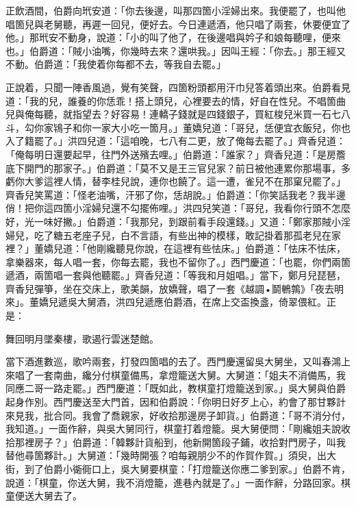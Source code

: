 正飲酒間，伯爵向玳安道：「你去後邊，叫那四箇小淫婦出來。我便罷了，也叫他唱箇兒與老舅聽，再遲一回兒，便好去。今日連遞酒，他只唱了兩套，休要便宜了他。」那玳安不動身，說道：「小的叫了他了，在後邊唱與妗子和娘每聽哩，便來也。」伯爵道：「賊小油嘴，你幾時去來？還哄我。」因叫王經：「你去。」那王經又不動。伯爵道：「我使着你每都不去，等我自去罷。」

正說着，只聞一陣香風過，覺有笑聲，四箇粉頭都用汗巾兒答着頭出來。伯爵看見道：「我的兒，誰養的你恁乖！搭上頭兒，心裡要去的情，好自在性兒。不唱箇曲兒與俺每聽，就指望去？好容易！連轎子錢就是四錢銀子，買紅梭兒米買一石七八斗，勾你家鴇子和你一家大小吃一箇月。」董嬌兒道：「哥兒，恁便宜衣飯兒，你也入了籍罷了。」洪四兒道：「這咱晚，七八有二更，放了俺每去罷了。」齊香兒道：「俺每明日還要起早，往門外送殯去哩。」伯爵道：「誰家？」齊香兒道：「是房簷底下開門的那家子。」伯爵道：「莫不又是王三官兒家？前日被他連累你那場事，多虧你大爹這裡人情，替李桂兒說，連你也饒了。這一遭，雀兒不在那窠兒罷了。」{}齊香兒笑罵道：「怪老油嘴，汗邪了你，恁胡說。」伯爵道：「你笑話我老？我半邊俏！把你這四箇小淫婦兒還不勾擺佈哩。」洪四兒笑道：「哥兒，我看你行頭不怎麼好，光一味好撇。」伯爵道：「我那兒，到跟前看手段還錢。」又道：「鄭家那賊小淫婦兒，吃了糖五老座子兒，白不言語，有些出神的模樣，敢記掛着那孤老兒在家裡？」董嬌兒道：「他剛纔聽見你說，在這裡有些怯床。」伯爵道：「怯床不怯床，拿樂器來，每人唱一套，你每去罷，我也不留你了。」西門慶道：「也罷，你們兩箇遞酒，兩箇唱一套與他聽罷。」齊香兒道：「等我和月姐唱。」當下，鄭月兒琵琶，齊香兒彈箏，坐在交床上，歌美韻，放嬌聲，唱了一套《越調•鬬鵪鶉》「夜去明來」。董嬌兒遞吳大舅酒，洪四兒遞應伯爵酒，在席上交盃換盞，倚翠偎紅。正是：

\begin{myquote} 
舞回明月墜秦樓，歌遏行雲迷楚館。
\end{myquote} 

當下酒進數巡，歌吟兩套，打發四箇唱的去了。西門慶還留吳大舅坐，又叫春鴻上來唱了一套南曲，纔分付棋童備馬，拿燈籠送大舅。大舅道：「姐夫不消備馬，我同應二哥一路走罷。」西門慶道：「既如此，教棋童打燈籠送到家。」吳大舅與伯爵起身作別。西門慶送至大門首，因和伯爵說：「你明日好歹上心，約會了那甘夥計來見我，批合同。我會了喬親家，好收拾那邊房子卸貨。」伯爵道：「哥不消分付，我知道。」一面作辭，與吳大舅同行，棋童打着燈籠。吳大舅便問：「剛纔姐夫說收拾那裡房子？」伯爵道：「韓夥計貨船到，他新開箇段子鋪，收拾對門房子，叫我替他尋箇夥計。」大舅道：「幾時開張？咱每親朋少不的作賀作賀。」{}須臾，出大街，到了伯爵小衚衕口上，吳大舅要棋童：「打燈籠送你應二爹到家。」伯爵不肯，說道：「棋童，你送大舅，我不消燈籠，進巷內就是了。」一面作辭，分路回家。棋童便送大舅去了。

